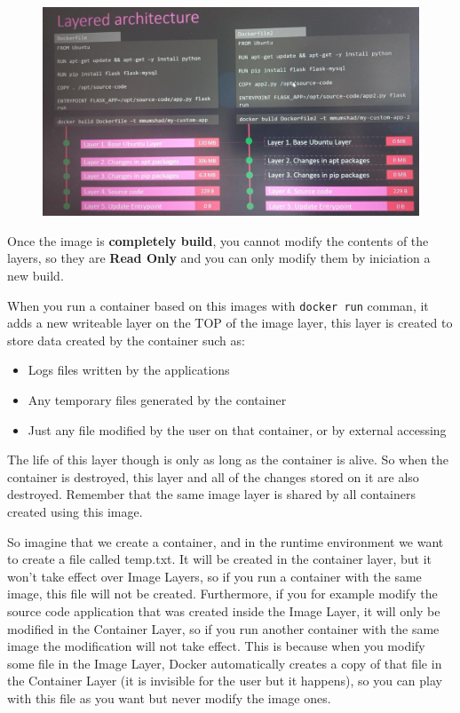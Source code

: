 \documentclass{article}
\newenvironment{blocktemplateII}[1]{%
    \tcolorbox[beamer,%
    noparskip,breakable,
    colframe=Green,%
    colbacklower=LimeGreen!75!LightGreen,%
    title=#1]}%
    {\endtcolorbox}
\begin{document}
\begin{figure}[H]
    \centering
    \includegraphics[width=\textwidth]{pictures/st2.png}
\end{figure}

\begin{blocktemplateII}{NOTE}
Once the image is \textbf{completely build}, you cannot modify the contents of the layers, so they are \textbf{Read Only} and you can only modify them by iniciation a new build.
\end{blocktemplateII}

When you run a container based on this images with \verb|docker run| comman, it adds a new writeable layer on the TOP of the image layer, this layer is created to store data created by the container such as:

\begin{itemize}
    \item Logs files written by the applications
    \item Any temporary files generated by the container
    \item Just any file modified by the user on that container, or by external accessing
\end{itemize}

The life of this layer though is only as long as the container is alive. So when the container is destroyed, this layer and all of the changes stored on it are also destroyed. Remember that the same image layer is shared by all containers created using this image.

So imagine that we create a container, and in the runtime environment we want to create a file called temp.txt. It will be created in the container layer, but it won't take effect over Image Layers, so if you run a container with the same image, this file will not be created. Furthermore, if you for example modify the source code application that was created inside the Image Layer, it will only be modified in the Container Layer, so if you run another container with the same image the modification will not take effect. This is because when you modify some file in the Image Layer, Docker automatically creates a copy of that file in the Container Layer (it is invisible for the user but it happens), so you can play with this file as you want but never modify the image ones.
\end{document}
